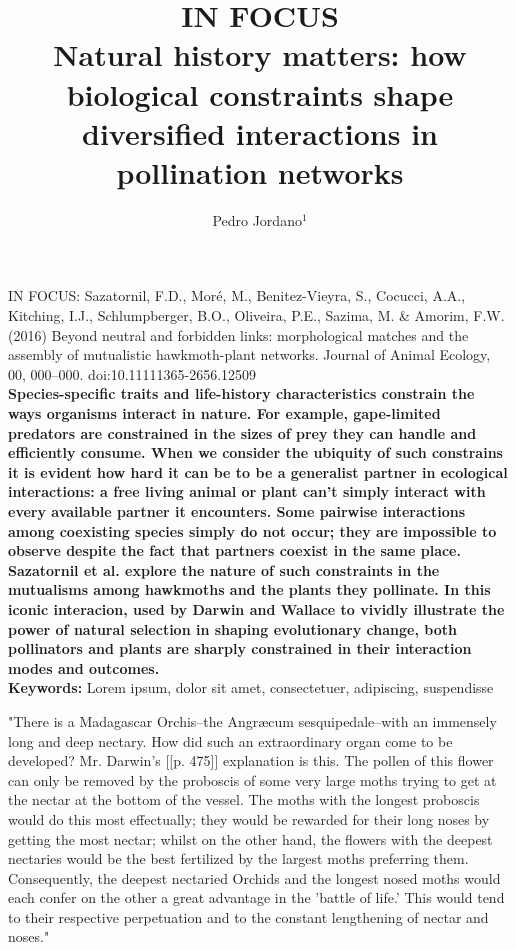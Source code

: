 \documentclass[a4paper,12pt]{article}
\title{IN FOCUS \\ Natural history matters: how biological constraints shape diversified interactions in pollination networks}
\author{Pedro Jordano$^{1}$}
\begin{document}
\maketitle

  \noindent 
  IN FOCUS: Sazatornil, F.D., Moré, M., Benitez-Vieyra, S., Cocucci, A.A., Kitching, I.J., Schlumpberger, B.O., Oliveira, P.E., Sazima, M. \& Amorim, F.W. (2016) Beyond neutral and forbidden links: morphological matches and the assembly of mutualistic hawkmoth-plant networks. Journal of Animal Ecology, 00, 000–000. doi:10.1111\/1365-2656.12509 \\
  
  \textbf{Species-specific traits and life-history characteristics constrain the ways organisms interact in nature. For example, gape-limited predators are constrained in the sizes of prey they can handle and efficiently consume. When we consider the ubiquity of such constrains it is evident how hard it can be to be a generalist partner in ecological interactions: a free living animal or plant can't simply interact with every available partner it encounters. Some pairwise interactions among coexisting species simply do not occur; they are impossible to observe despite the fact that partners coexist in the same place. Sazatornil et al. explore the nature of such constraints in the mutualisms among hawkmoths and the plants they pollinate. In this iconic interacion, used by Darwin and Wallace to vividly illustrate the power of natural selection in shaping evolutionary change, both pollinators and plants are sharply constrained in their interaction modes and outcomes. } \\

\noindent \textbf{Keywords:} Lorem ipsum, dolor sit amet, consectetuer, adipiscing,
suspendisse

\newpage

 "There is a Madagascar Orchis--the Angræcum sesquipedale--with an immensely long and deep nectary. How did such an extraordinary organ come to be developed? Mr. Darwin's [[p. 475]] explanation is this. The pollen of this flower can only be removed by the proboscis of some very large moths trying to get at the nectar at the bottom of the vessel. The moths with the longest proboscis would do this most effectually; they would be rewarded for their long noses by getting the most nectar; whilst on the other hand, the flowers with the deepest nectaries would be the best fertilized by the largest moths preferring them. Consequently, the deepest nectaried Orchids and the longest nosed moths would each confer on the other a great advantage in the 'battle of life.' This would tend to their respective perpetuation and to the constant lengthening of nectar and noses."
 
\end{document}
